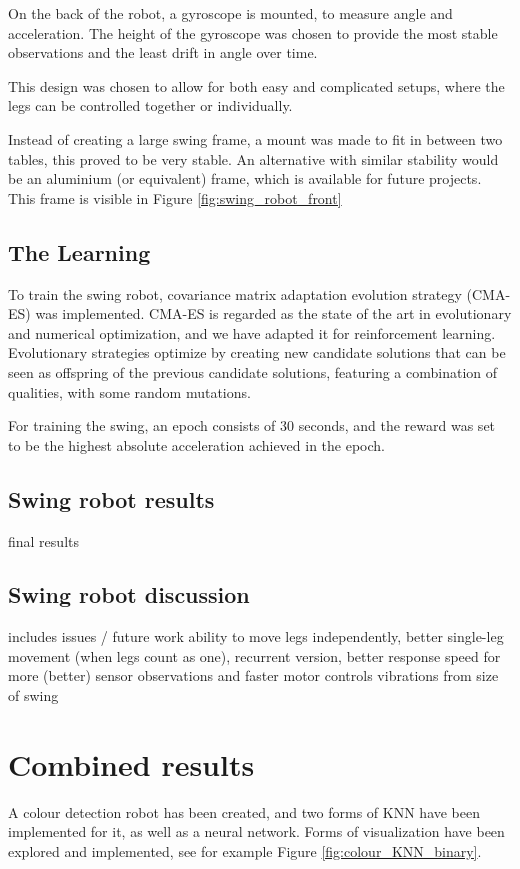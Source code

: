 \documentclass[11pt, a4paper]{article}
\begin{document}
On the back of the robot, a gyroscope is mounted, to measure angle and acceleration. The height of the gyroscope was chosen to provide the most stable observations and the least drift in angle over time.

This design was chosen to allow for both easy and complicated setups, where the legs can be controlled together or individually.

Instead of creating a large swing frame, a mount was made to fit in between two tables, this proved to be very stable. An alternative with similar stability would be an aluminium (or equivalent) frame, which is available for future projects. This frame is visible in Figure \ref{fig:swing_robot_front}



\subsection{The Learning}
To train the swing robot, covariance matrix adaptation evolution strategy (CMA-ES) was implemented. CMA-ES is regarded as the state of the art in evolutionary and numerical optimization, and we have adapted it for reinforcement learning. Evolutionary strategies optimize by creating new candidate solutions that can be seen as offspring of the previous candidate solutions, featuring a combination of qualities, with some random mutations.

For training the swing, an epoch consists of 30 seconds, and the reward was set to be the highest absolute acceleration achieved in the epoch.
\subsection{Swing robot results}
final results
\subsection{Swing robot discussion}
includes issues / future work
ability to move legs independently, better single-leg movement (when legs count as one), recurrent version, better response speed for more (better) sensor observations and faster motor controls
vibrations from size of swing

\section{Combined results}
A colour detection robot has been created, and two forms of KNN have been implemented for it, as well as a neural network. Forms of visualization have been explored and implemented, see for example Figure \ref{fig:colour_KNN_binary}.
 
\end{document}
